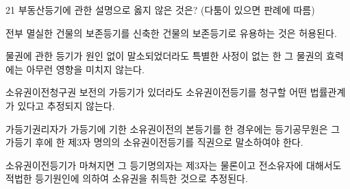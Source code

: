 \begin{question}{21}
부동산등기에 관한 설명으로 옳지 않은 것은? (다툼이 있으면 판례에 따름)
\begin{choices}
  \item 전부 멸실한 건물의 보존등기를 신축한 건물의 보존등기로 유용하는 것은 허용된다.
  \item 물권에 관한 등기가 원인 없이 말소되었더라도 특별한 사정이 없는 한 그 물권의 효력에는 아무런 영향을 미치지 않는다.
  \item 소유권이전청구권 보전의 가등기가 있더라도 소유권이전등기를 청구할 어떤 법률관계가 있다고 추정되지 않는다.
  \item 가등기권리자가 가등기에 기한 소유권이전의 본등기를 한 경우에는 등기공무원은 그 가등기 후에 한 제3자 명의의 소유권이전등기를 직권으로 말소하여야 한다.
  \item 소유권이전등기가 마쳐지면 그 등기명의자는 제3자는 물론이고 전소유자에 대해서도 적법한 등기원인에 의하여 소유권을 취득한 것으로 추정된다.
\end{choices}
\end{question}
